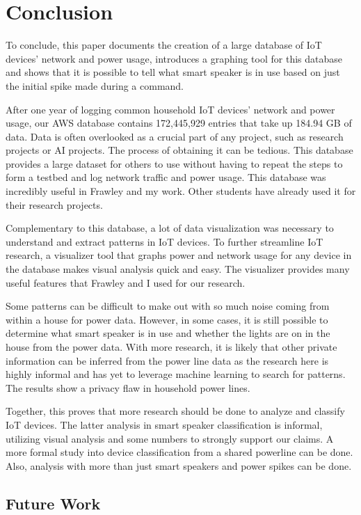 \chapter{Conclusion}
\label{Conclusion}
To conclude, this paper documents the creation of a large database of IoT devices' network and power usage, introduces a graphing tool for this database and shows that it is possible to tell what smart speaker is in use based on just the initial spike made during a command.

After one year of logging common household IoT devices' network and power usage, our AWS database contains 172,445,929 entries that take up 184.94 GB of data. Data is often overlooked as a crucial part of any project, such as research projects or AI projects. The process of obtaining it can be tedious. This database provides a large dataset for others to use without having to repeat the steps to form a testbed and log network traffic and power usage. This database was incredibly useful in Frawley and my work. Other students have already used it for their research projects.

Complementary to this database, a lot of data visualization was necessary to understand and extract patterns in IoT devices. To further streamline IoT research, a visualizer tool that graphs power and network usage for any device in the database makes visual analysis quick and easy. The visualizer provides many useful features that Frawley and I used for our research.

Some patterns can be difficult to make out with so much noise coming from within a house for power data. However, in some cases, it is still possible to determine what smart speaker is in use and whether the lights are on in the house from the power data. With more research, it is likely that other private information can be inferred from the power line data as the research here is highly informal and has yet to leverage machine learning to search for patterns. The results show a privacy flaw in household power lines.

Together, this proves that more research should be done to analyze and classify IoT devices. The latter analysis in smart speaker classification is informal, utilizing visual analysis and some numbers to strongly support our claims. A more formal study into device classification from a shared powerline can be done. Also, analysis with more than just smart speakers and power spikes can be done.

\section{Future Work}

